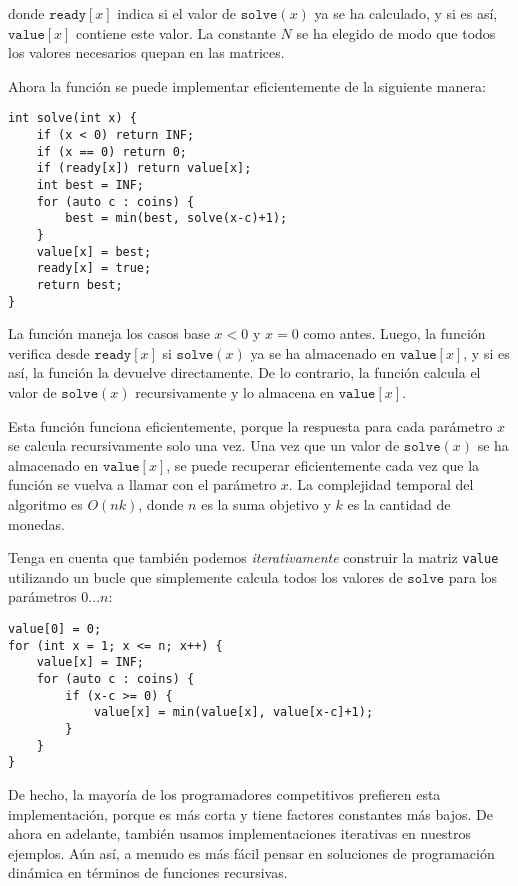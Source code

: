 donde $\texttt{ready}[x]$ indica
si el valor de $\texttt{solve}(x)$ ya se ha calculado,
y si es así, $\texttt{value}[x]$
contiene este valor.
La constante $N$ se ha elegido de modo que
todos los valores necesarios quepan en las matrices.

Ahora la función se puede implementar eficientemente
de la siguiente manera:

\begin{lstlisting}
int solve(int x) {
    if (x < 0) return INF;
    if (x == 0) return 0;
    if (ready[x]) return value[x];
    int best = INF;
    for (auto c : coins) {
        best = min(best, solve(x-c)+1);
    }
    value[x] = best;
    ready[x] = true;
    return best;
}
\end{lstlisting}

La función maneja los casos base
$x<0$ y $x=0$ como antes.
Luego, la función verifica desde
$\texttt{ready}[x]$ si
$\texttt{solve}(x)$ ya se ha almacenado
en $\texttt{value}[x]$,
y si es así, la función la devuelve directamente.
De lo contrario, la función calcula el valor
de $\texttt{solve}(x)$
recursivamente y lo almacena en $\texttt{value}[x]$.

Esta función funciona eficientemente,
porque la respuesta para cada parámetro $x$
se calcula recursivamente solo una vez.
Una vez que un valor de $\texttt{solve}(x)$ se ha almacenado en $\texttt{value}[x]$,
se puede recuperar eficientemente cada vez que la
función se vuelva a llamar con el parámetro $x$.
La complejidad temporal del algoritmo es $O(nk)$,
donde $n$ es la suma objetivo y $k$ es la cantidad de monedas.

Tenga en cuenta que también podemos \emph{iterativamente}
construir la matriz \texttt{value} utilizando
un bucle que simplemente calcula todos los valores
de $\texttt{solve}$ para los parámetros $0 \ldots n$:
\begin{lstlisting}
value[0] = 0;
for (int x = 1; x <= n; x++) {
    value[x] = INF;
    for (auto c : coins) {
        if (x-c >= 0) {
            value[x] = min(value[x], value[x-c]+1);
        }
    }
}
\end{lstlisting}

De hecho, la mayoría de los programadores competitivos prefieren esta
implementación, porque es más corta y tiene
factores constantes más bajos.
De ahora en adelante, también usamos implementaciones iterativas
en nuestros ejemplos.
Aún así, a menudo es más fácil pensar en
soluciones de programación dinámica
en términos de funciones recursivas.


